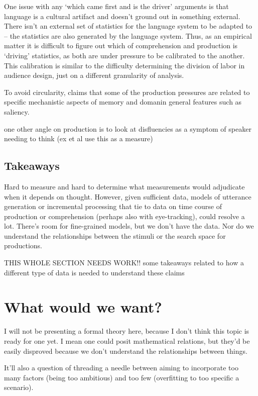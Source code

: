 \documentclass[]{article}
\begin{document}
One issue with any `which came first and is the driver' arguments is that language is a cultural artifact and doesn't ground out in something external. There isn't an external set of statistics for the language system to be adapted to -- the statistics are also generated by the language system. Thus, as an empirical matter it is difficult to figure out which of comprehension and production is `driving' statistics, as both are under pressure to be calibrated to the another. This calibration is similar to the difficulty determining the division of labor in audience design, just on a different granularity of analysis. 

To avoid circularity, \cite{macdonald2013} claims that some of the production pressures are related to specific mechanistic aspects of memory and domanin general features such as saliency. %

one other angle on production is to look at disfluencies as a symptom of speaker needing to think (ex \cite{yoon2014} et al use this as a measure)

\subsection{Takeaways}
Hard to measure and hard to determine what measurements would adjudicate when it depends on thought. However, given sufficient data, models of utterance generation or incremental processing that tie to data on time course of production or comprehension (perhaps also with eye-tracking), could resolve a lot. There's room for fine-grained models, but we don't have the data. Nor do we understand the relationships between the stimuli or the search space for productions. 

THIS WHOLE SECTION NEEDS WORK!!
some takeaways related to how a different type of data is needed to understand these claims


	\section{What would we want?}
	
	I will not be presenting a formal theory here, because I don't think this topic is ready for one yet. I mean one could posit mathematical relations, but they'd be easily disproved because we don't understand the relationships between things. 
	
	It'll also a question of threading a needle between aiming to incorporate too many factors (being too ambitious) and too few (overfitting to too specific a scenario). 
	
\end{document}

